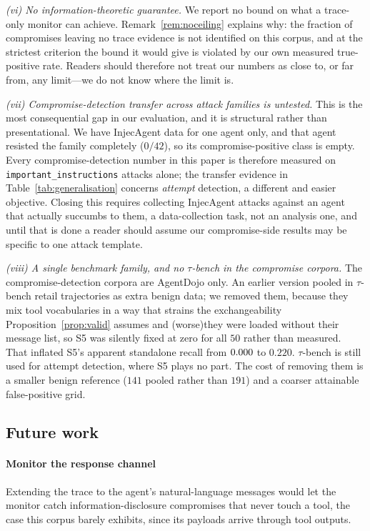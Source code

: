 \documentclass[pdflatex,sn-basic]{sn-jnl}%
\theoremstyle{thmstyleone}
\theoremstyle{thmstyletwo}
\theoremstyle{thmstylethree}
\begin{document}
\emph{(vi) No information-theoretic guarantee.} We report no bound on what a
trace-only monitor can achieve. Remark~\ref{rem:noceiling} explains why: the
fraction of compromises leaving no trace evidence is not identified on this corpus,
and at the strictest criterion the bound it would give is violated by our own
measured true-positive rate. Readers should therefore not treat our numbers as
close to, or far from, any limit---we do not know where the limit is.

\emph{(vii) Compromise-detection transfer across attack families is untested.}
This is the most consequential gap in our evaluation, and it is structural rather
than presentational. We have InjecAgent data for one agent only, and that agent
resisted the family completely ($0/42$), so its compromise-positive class is empty.
Every compromise-detection number in this paper is therefore measured on
\texttt{important\_instructions} attacks alone; the transfer evidence in
Table~\ref{tab:generalisation} concerns \emph{attempt} detection, a different and
easier objective. Closing this requires collecting InjecAgent attacks against an
agent that actually succumbs to them, a data-collection task, not an analysis
one, and until that is done a reader should assume our compromise-side results may
be specific to one attack template.

\emph{(viii) A single benchmark family, and no $\tau$-bench in the compromise
corpora.} The compromise-detection corpora are AgentDojo only. An earlier version
pooled in $\tau$-bench retail trajectories as extra benign data; we removed them,
because they mix tool vocabularies in a way that strains the exchangeability
Proposition~\ref{prop:valid} assumes and (worse)they were loaded without their
message list, so S5 was silently fixed at zero for all $50$ rather than measured.
That inflated S5's apparent standalone recall from $0.000$ to $0.220$. $\tau$-bench
is still used for attempt detection, where S5 plays no part. The cost of removing
them is a smaller benign reference ($141$ pooled rather than $191$) and a coarser
attainable false-positive grid.

\subsection{Future work}

\paragraph{Monitor the response channel} Extending the trace to the agent's
natural-language messages would let the monitor catch information-disclosure
compromises that never touch a tool, the case this corpus barely exhibits, since
its payloads arrive through tool outputs.
\end{document}
